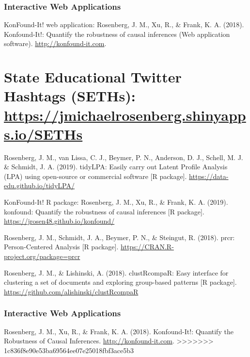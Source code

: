 \documentclass[14,]{article}
\begin{document}
\subsubsection{Interactive Web
Applications}\label{interactive-web-applications}

KonFound-It! web application: Rosenberg, J. M., Xu, R., \& Frank, K. A.
(2018). Konfound-It!: Quantify the robustness of causal inferences (Web
application software). \url{http://konfound-it.com}.

\section{\texorpdfstring{State Educational Twitter Hashtags (SETHs):
\href{https://jmichaelrosenberg.shinyapps.io/SETHs/}{https://jmichaelrosenberg.shinyapps.io/SETHs}}{State Educational Twitter Hashtags (SETHs): https://jmichaelrosenberg.shinyapps.io/SETHs}}\label{state-educational-twitter-hashtags-seths-httpsjmichaelrosenberg.shinyapps.ioseths}

Rosenberg, J. M., van Lissa, C. J., Beymer, P. N., Anderson, D. J.,
Schell, M. J. \& Schmidt, J. A. (2019). tidyLPA: Easily carry out Latent
Profile Analysis (LPA) using open-source or commercial software {[}R
package{]}. \url{https://data-edu.github.io/tidyLPA/}

KonFound-It! R package: Rosenberg, J. M., Xu, R., \& Frank, K. A.
(2019). konfound: Quantify the robustness of causal inferences {[}R
package{]}. \url{https://jrosen48.github.io/konfound/}

Rosenberg, J. M., Schmidt, J. A., Beymer, P. N., \& Steingut, R. (2018).
prcr: Person-Centered Analysis {[}R package{]}.
\url{https://CRAN.R-project.org/package=prcr}

Rosenberg, J. M., \& Lishinski, A. (2018). clustRcompaR: Easy interface
for clustering a set of documents and exploring group-based patterns
{[}R package{]}. \url{https://github.com/alishinski/clustRcompaR}

\subsubsection{Interactive Web
Applications}\label{interactive-web-applications-1}

Rosenberg, J. M., Xu, R., \& Frank, K. A. (2018). Konfound-It!: Quantify
the Robustness of Causal Inferences. \url{http://konfound-it.com}.
\textgreater{}\textgreater{}\textgreater{}\textgreater{}\textgreater{}\textgreater{}\textgreater{}
1c836f8e90e53ba69564ee07e25018fbf3ace5b3
\end{document}
